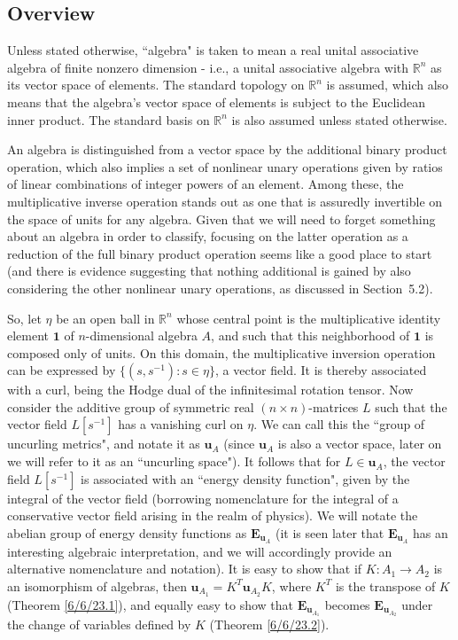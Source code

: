 \documentclass{amsart}
\numberwithin{equation}{section}
\theoremstyle{definition}
\numberwithin{theorem}{section}
\begin{document}
      
\subsection{Overview}  Unless stated otherwise, ``algebra" is taken to mean a real unital associative algebra of finite nonzero dimension - i.e., a unital associative algebra with $\mathbb{R}^n$ as its vector space of elements.  The standard topology on $\mathbb{R}^n$ is assumed, which also means that the algebra's vector space of elements is subject to the Euclidean inner product. The standard basis on $\mathbb{R}^n$ is also assumed unless stated otherwise.

An algebra is distinguished from a vector space by the additional binary product operation, which also implies a set of nonlinear unary operations given by ratios of linear combinations of integer powers of an element.  Among these, the multiplicative inverse operation stands out as one that is assuredly invertible on the space of units for any algebra. Given that we will need to forget something about an algebra in order to classify, focusing on the latter operation as a reduction of the full binary product operation seems like a good place to start (and there is evidence suggesting that nothing additional is gained by also considering the other nonlinear unary operations, as discussed in \mbox{Section 5.2}).

So, let $\eta$ be an open ball in $\mathbb{R}^n$ whose central point is the multiplicative identity element $\mathbf{1}$ of $n$-dimensional algebra $A$, and such that this neighborhood of $\mathbf{1}$ is composed only of units.  On this domain, the multiplicative inversion operation can be expressed by $\{(s,s^{-1}):s\in\eta\}$, a vector field.  It is thereby associated with a curl, being the Hodge dual of the infinitesimal rotation tensor.  Now consider the additive group of symmetric real $(n\times n)$-matrices $L$ such that the vector field $L[s^{-1}]$ has a vanishing curl on $\eta$.  We can call this the ``group of uncurling metrics", and notate it as $\mathbf{u}_A$ (since $\mathbf{u}_A$ is also a vector space, later on we will refer to it as an ``uncurling space").   It follows that for $L\in \mathbf{u}_A$, the vector field $L[s^{-1}]$ is associated with an ``energy density function", given by the integral of the vector field (borrowing nomenclature for the integral of a conservative vector field arising in the realm of physics).   
 We will notate the abelian group of energy density functions as $\mathbf{E}_{\mathbf{u}_A}$ (it is seen later that $\mathbf{E}_{\mathbf{u}_A}$ has an interesting algebraic interpretation, and we will accordingly provide an alternative nomenclature and notation).  It is easy to show that if $K:A_1\rightarrow A_2$ is an isomorphism of algebras, then $\mathbf{u}_{A_1} = K^T \mathbf{u}_{A_2}K $,  where $K^T$ is the transpose of $K$ (Theorem \ref{6/6/23.1}), and equally easy to show that $\mathbf{E}_{\mathbf{u}_{A_1}}$ becomes $\mathbf{E}_{\mathbf{u}_{A_2}}$ under the change of variables defined by $K$ (Theorem \ref{6/6/23.2}).  
\end{document}
